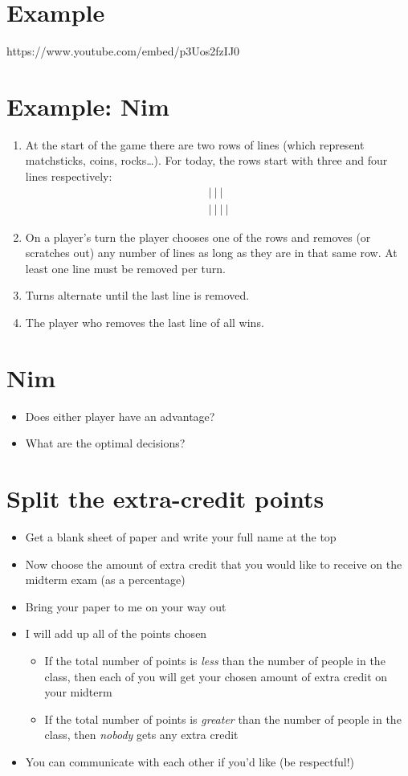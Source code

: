 \documentclass[11pt]{article}
\begin{document}
\section*{Example}
\label{sec:orgd38b387}
https://www.youtube.com/embed/p3Uos2fzIJ0

\section*{Example: Nim}
\label{sec:org8c35b2d}
\begin{enumerate}
\item At the start of the game there are two rows of lines (which represent matchsticks, coins, rocks\ldots{}).  For today, the rows start with three and four lines respectively:
\begin{align*} |~|~|~\phantom{|} \\ |~|~|~| \end{align*}
\item On a player’s turn the player chooses one of the rows and removes (or scratches out) any number of lines as long as they are in that same row. At least one line must be removed per turn.
\item Turns alternate until the last line is removed.
\item The player who removes the last line of all wins.
\end{enumerate}


\section*{Nim}
\label{sec:orgaba37af}
\begin{itemize}
\item Does either player have an advantage?
\item What are the optimal decisions?
\end{itemize}

\section*{Split the extra-credit points}
\label{sec:orged49ec1}
\begin{itemize}
\item Get a blank sheet of paper and write your full name at the top
\item Now choose the amount of extra credit that you would like to receive on the midterm exam (as a percentage)
\item Bring your paper to me on your way out
\item I will add up all of the points chosen
\begin{itemize}
\item If the total number of points is \emph{less} than the number of people in the class, then each of you will get your chosen amount of extra credit on your midterm
\item If the total number of points is \emph{greater} than the number of people in the class, then \emph{nobody} gets any extra credit
\end{itemize}
\item You can communicate with each other if you'd like (be respectful!)
\end{itemize}
\end{document}
